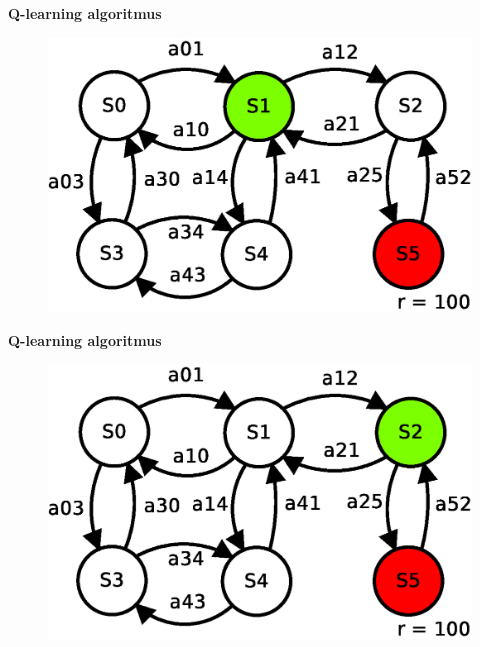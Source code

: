 \documentclass[xcolor=dvipsnames]{beamer}
\begin{document}
\begin{frame}{\bf Q-learning algoritmus}

\begin{figure}[!htb]
\includegraphics[scale=.5]{../diagrams/q_learning_table_02.eps}
\end{figure}

\end{frame}

\begin{frame}{\bf Q-learning algoritmus}

\begin{figure}[!htb]
\includegraphics[scale=.5]{../diagrams/q_learning_table_03.eps}
\end{figure}

\end{frame}
\end{document}
